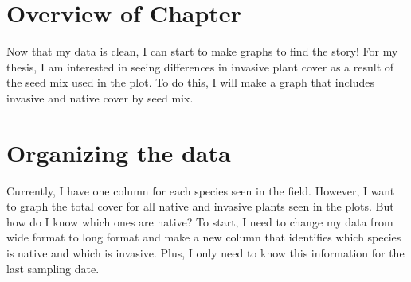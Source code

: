 \documentclass[
]{book}
\begin{document}
\hypertarget{overview-of-chapter}{%
\section{Overview of Chapter}\label{overview-of-chapter}}

Now that my data is clean, I can start to make graphs to find the story! For my thesis, I am interested in seeing differences in invasive plant cover as a result of the seed mix used in the plot. To do this, I will make a graph that includes invasive and native cover by seed mix.

\hypertarget{organizing-the-data}{%
\section{Organizing the data}\label{organizing-the-data}}

Currently, I have one column for each species seen in the field. However, I want to graph the total cover for all native and invasive plants seen in the plots. But how do I know which ones are native? To start, I need to change my data from wide format to long format and make a new column that identifies which species is native and which is invasive. Plus, I only need to know this information for the last sampling date.
\end{document}
